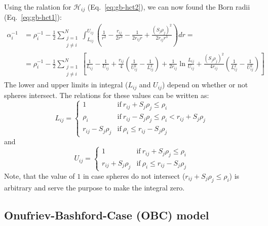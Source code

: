 \documentclass[11pt]{book}
\begin{document}
Using the ralation for $\mathscr{H}_{ij}$ (Eq.~\ref{eq:gb-hct2}), we can now found the Born radii (Eq.~\ref{eq:gb-hct1}):
\begin{equation}\label{eq:gb-hct3}
\begin{split}
\alpha_{i}^{-1}&=\rho_{i}^{-1}-\frac{1}{2}\sum_{\substack{j=1\\j\ne i}}^{N}\int_{L_{ij}}^{U_{ij}}\left(\frac{1}{r^{2}}-\frac{r_{ij}}{2r^{3}}-\frac{1}{2r_{ij}r}+\frac{(S_{j}\rho_{j})^{2}}{2r_{ij}r^{3}}\right)dr=\\
&=\rho_{i}^{-1}-\frac{1}{2}\sum_{\substack{j=1\\j\ne i}}^{N}\left[\frac{1}{L_{ij}}-\frac{1}{U_{ij}}+\frac{r_{ij}}{4}\left(\frac{1}{U_{ij}^{2}}-\frac{1}{L_{ij}^{2}}\right)+\frac{1}{2r_{ij}}\ln\frac{L_{ij}}{U_{ij}}+\frac{(S_{j}\rho_{j})^{2}}{4r_{ij}}\left(\frac{1}{L_{ij}^{2}}-\frac{1}{U_{ij}^{2}}\right)\right]
\end{split}
\end{equation}
The lower and upper limits in integral ($L_{ij}$ and $U_{ij}$) depend on whether or not spheres intersect. The relations for these values can be written as:
\begin{equation}\label{eq:gb-hct-Lij}
L_{ij}=
\begin{cases}
1 &\mathrm{if~} r_{ij}+S_{j}\rho_{j}\le\rho_{i}\\
\rho_{i} &\mathrm{if~} r_{ij}-S_{j}\rho_{j}\le\rho_{i}<r_{ij}+S_{j}\rho_{j}\\
r_{ij}-S_{j}\rho_{j} &\mathrm{if~} \rho_{i}\le r_{ij}-S_{j}\rho_{j}
\end{cases}
\end{equation}
and
\begin{equation}\label{eq:gb-hct-Uij}
U_{ij}=
\begin{cases}
1 &\mathrm{if~} r_{ij}+S_{j}\rho_{j}\le\rho_{i}\\
r_{ij}+S_{j}\rho_{j} &\mathrm{if~} \rho_{i}\le r_{ij}-S_{j}\rho_{j}
\end{cases}
\end{equation}
Note, that the value of $1$ in case spheres do not intersect ($r_{ij}+S_{j}\rho_{j}\le\rho_{i}$) is arbitrary and serve the purpose to make the integral zero.


\subsection{Onufriev-Bashford-Case (OBC) model}
\end{document}
